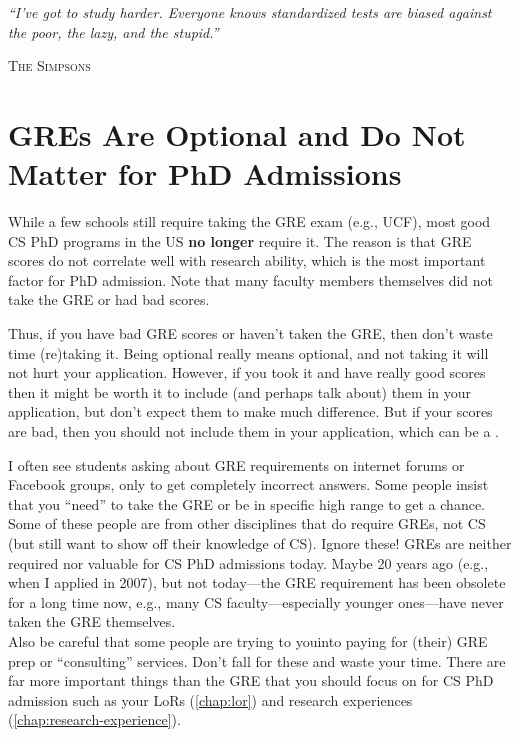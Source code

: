 \documentclass[oneside,11pt]{book}
\newcommand{\myepigraphsimpsons}[1]{
  \epigraph{\vspace{-0.2in} \emph{#1}}{\textsc{The Simpsons}}
}
\newenvironment{warningbox}[1][]{
  \small
  \begin{marker}[\faChessKing{}]
    {\textbf{#1}}
  }{
  \end{marker}
}
\newcommand{\red}[1]{{\color{red}{#1}}}
\begin{document}
\myepigraphsimpsons{``I've got to study harder. Everyone knows standardized tests are biased against the poor, the lazy, and the stupid.''}


\section{GREs Are Optional and Do Not Matter for PhD Admissions}\label{sec:gre}

While a few schools still require taking the \acrfull{GRE} exam (e.g., UCF), most good CS PhD programs in the US \textbf{no longer} require it. The reason is that GRE scores do not correlate well with research ability, which is the most important factor for PhD admission. Note that many faculty members themselves did not take the GRE or had bad scores.

Thus, if you have bad GRE scores or haven't taken the GRE, then don't waste time (re)taking it. Being optional really means optional, and not taking it will not hurt your application.
However, if you took it and have really good scores then it might be worth it to include (and perhaps talk about) them in your application, but don't expect them to make much difference. But if your scores are bad, then you should not include them in your application, which can be a \red{red flag}.

\begin{warningbox}
  I often see students asking about GRE requirements on internet forums or Facebook groups, only to get completely incorrect answers. Some people insist that you ``need'' to take the GRE or be in specific high range to get a chance.
  Some of these people are from other disciplines that do require GREs, not CS (but still want to show off their knowledge of CS). Ignore these! GREs are neither required nor valuable for CS PhD admissions today. Maybe 20 years ago (e.g., when I applied in 2007), but not today---the GRE requirement has been obsolete for a long time now, e.g., many CS faculty---especially younger ones---have never taken the GRE themselves.\\

  Also be careful that some people are trying to  youinto paying for (their) GRE prep or ``consulting'' services. Don't fall for these and waste your time. There are far more important things than the GRE that you should focus on for CS PhD admission such as your LoRs (\autoref{chap:lor}) and research experiences (\autoref{chap:research-experience}). 
\end{warningbox}
\end{document}
